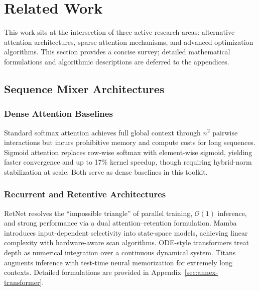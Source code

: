 \section{Related Work}

This work sits at the intersection of three active research areas: alternative attention architectures, sparse attention mechanisms, and advanced optimization algorithms. This section provides a concise survey; detailed mathematical formulations and algorithmic descriptions are deferred to the appendices.

\subsection{Sequence Mixer Architectures}

\subsubsection{Dense Attention Baselines}
Standard softmax attention \citep{vaswani_attention_2017} achieves full global context through $n^2$ pairwise interactions but incurs prohibitive memory and compute costs for long sequences. Sigmoid attention \citep{ramapuram_theory_2024} replaces row-wise softmax with element-wise sigmoid, yielding faster convergence and up to 17\% kernel speedup, though requiring hybrid-norm stabilization at scale. Both serve as dense baselines in this toolkit.

\subsubsection{Recurrent and Retentive Architectures}
RetNet \citep{sun_retentive_2023} resolves the ``impossible triangle'' of parallel training, $\mathcal{O}(1)$ inference, and strong performance via a dual attention--retention formulation. Mamba \citep{gu_mamba_2023} introduces input-dependent selectivity into state-space models, achieving linear complexity with hardware-aware scan algorithms. ODE-style transformers \citep{zhang_continuous_2021} treat depth as numerical integration over a continuous dynamical system. Titans \citep{behrouz_titans_2025} augments inference with test-time neural memorization for extremely long contexts. Detailed formulations are provided in Appendix~\ref{sec:annex-transformer}.

